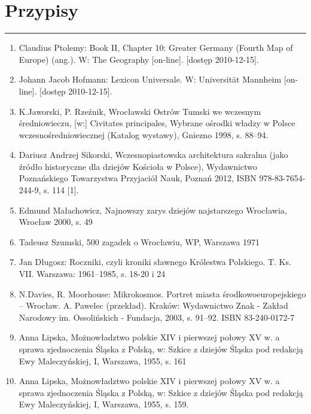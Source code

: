 \documentclass{article}
\begin{document}
\section{Przypisy}
\noindent\rule{\textwidth}{0.4pt}

    \begin{multicols}{3}
        \begin{enumerate} \scriptsize
            \item   \hypertarget{1}{Claudius Ptolemy: Book II, Chapter 10: Greater Germany (Fourth Map of Europe) (ang.). W: The Geography [on-line]. [dostęp 2010-12-15].}
            \item   \hypertarget{2}{Johann Jacob Hofmann: Lexicon Universale. W: Universität Mannheim [on-line]. [dostęp 2010-12-15].}
            \item   \hypertarget{3}{K.Jaworski, P. Rzeźnik, Wrocławski Ostrów Tumski we wczesnym średniowieczu, [w:] Civitates principales, Wybrane ośrodki władzy w Polsce wczesnośredniowiecznej (Katalog wystawy), Gniezno 1998, s. 88–94.}
            \item   \hypertarget{4}{Dariusz Andrzej Sikorski, Wczesnopiastowska architektura sakralna (jako źródło historyczne dla dziejów Kościoła w Polsce), Wydawnictwo Poznańskiego Towarzystwa Przyjaciół Nauk, Poznań 2012, ISBN 978-83-7654-244-9, s. 114 [1].}
            \item   \hypertarget{5}{Edmund Małachowicz, Najnowszy zarys dziejów najstarszego Wrocławia, Wrocław 2000, s. 49}
            \item   \hypertarget{6}{Tadeusz Szumski, 500 zagadek o Wrocławiu, WP, Warszawa 1971}
            \item   \hypertarget{7}{Jan Długosz: Roczniki, czyli kroniki sławnego Królestwa Polskiego. T. Ks. VII. Warszawa: 1961–1985, s. 18-20 i 24}
            \item   \hypertarget{8}{N.Davies, R. Moorhouse: Mikrokosmos. Portret miasta środkowoeuropejskiego – Wrocław. A. Pawelec (przekład). Kraków: Wydawnictwo Znak - Zakład Narodowy im. Ossolińskich - Fundacja, 2003, s. 91–92. ISBN 83-240-0172-7}
            \item   \hypertarget{9}{Anna Lipska, Możnowładztwo polskie XIV i pierwszej połowy XV w. a sprawa zjednoczenia Śląska z Polską, w: Szkice z dziejów Śląska pod redakcją Ewy Maleczyńskiej, I, Warszawa, 1955, s. 161}
            \item   \hypertarget{10}{Anna Lipska, Możnowładztwo polskie XIV i pierwszej połowy XV w. a sprawa zjednoczenia Śląska z Polską, w: Szkice z dziejów Śląska pod redakcją Ewy Maleczyńskiej, I, Warszawa, 1955, s. 159.}

\end{enumerate}
\end{multicols}
\end{document}
